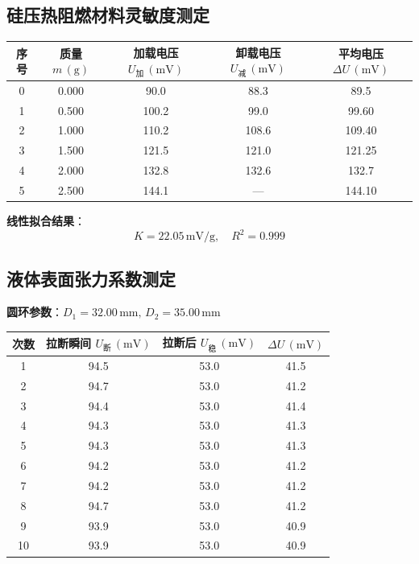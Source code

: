 \documentclass[12pt,a4paper]{article}
\begin{document}
\subsection{硅压热阻燃材料灵敏度测定}
\begin{table}[H]
\centering
\begin{tabular}{|c|c|c|c|c|}
\hline
序号 & 质量 $m \, (\text{g})$ & 加载电压 $U_{\text{加}} \, (\text{mV})$ & 卸载电压 $U_{\text{减}} \, (\text{mV})$ & 平均电压 $\Delta U \, (\text{mV})$ \\
\hline
0 & 0.000 & 90.0 & 88.3 & 89.5 \\
\hline
1 & 0.500 & 100.2 & 99.0 & 99.60 \\
\hline
2 & 1.000 & 110.2 & 108.6 & 109.40 \\
\hline
3 & 1.500 & 121.5 & 121.0 & 121.25 \\
\hline
4 & 2.000 & 132.8 & 132.6 & 132.7 \\
\hline
5 & 2.500 & 144.1 & — & 144.10 \\
\hline
\end{tabular}
\end{table}

\textbf{线性拟合结果}：
\begin{equation}
K = 22.05 \, \text{mV/g}, \quad R^2 = 0.999
\end{equation}

\subsection{液体表面张力系数测定}
\textbf{圆环参数}：$D_1 = 32.00 \, \text{mm}, \, D_2 = 35.00 \, \text{mm}$

\begin{table}[H]
\centering
\begin{tabular}{|c|c|c|c|}
\hline
次数 & 拉断瞬间 $U_{\text{断}} \, (\text{mV})$ & 拉断后 $U_{\text{稳}} \, (\text{mV})$ & $\Delta U \, (\text{mV})$ \\
\hline
1 & 94.5 & 53.0 & 41.5 \\
\hline
2 & 94.7 & 53.0 & 41.2 \\
\hline
3 & 94.4 & 53.0 & 41.4 \\
\hline
4 & 94.3 & 53.0 & 41.3 \\
\hline
5 & 94.3 & 53.0 & 41.3 \\
\hline
6 & 94.2 & 53.0 & 41.2 \\
\hline
7 & 94.2 & 53.0 & 41.2 \\
\hline
8 & 94.7 & 53.0 & 41.2 \\
\hline
9 & 93.9 & 53.0 & 40.9 \\
\hline
10 & 93.9 & 53.0 & 40.9 \\
\hline
\end{tabular}
\end{table}
\end{document}

